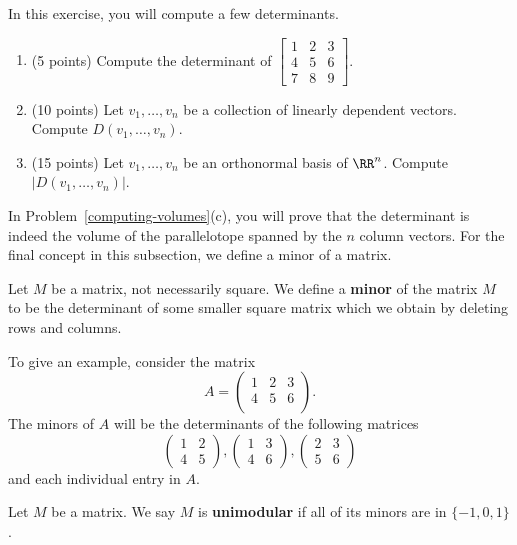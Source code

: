 \documentclass[11pt]{article}
\begin{document}
\begin{prob}
    In this exercise, you will compute a few determinants. 
    \begin{enumerate}[label = (\alph*)]
        \item (5 points) Compute the determinant of $\begin{bmatrix} 1 & 2 & 3 \\ 4 & 5 & 6 \\ 7 & 8 & 9 \end{bmatrix}$. 
        \item (10 points) Let $v_1, \ldots, v_n$ be a collection of linearly dependent vectors. Compute $D(v_1, \ldots, v_n)$. 
        \item (15 points) Let $v_1, \ldots, v_n$ be an orthonormal basis of $\RR^n$. Compute $|D(v_1, \ldots, v_n)|$. 
    \end{enumerate}
\end{prob}

In Problem~\ref{computing-volumes}(c), you will prove that the determinant is indeed the volume of the parallelotope spanned by the $n$ column vectors. For the final concept in this subsection, we define a minor of a matrix. 

\begin{defn}
    Let $M$ be a matrix, not necessarily square. We define a \textbf{minor} of the matrix $M$ to be the determinant of some smaller square matrix which we obtain by deleting rows and columns. 
\end{defn}

To give an example, consider the matrix 
\[
    A = \begin{pmatrix}
         1 & 2 & 3 \\
         4 & 5 & 6 \\
    \end{pmatrix}.   
\]
The minors of $A$ will be the determinants of the following matrices
\[
    \begin{pmatrix}
        1 & 2 \\ 4 & 5
    \end{pmatrix}, \begin{pmatrix} 1 & 3 \\ 4 & 6 \end{pmatrix}, \begin{pmatrix} 2 & 3 \\ 5 & 6 \end{pmatrix}
\]
and each individual entry in $A$. 

\begin{defn} \label{unimodular}
    Let $M$ be a matrix. We say $M$ is \textbf{unimodular} if all of its minors are in $\{-1, 0, 1\}$. 
\end{defn}
\end{document}
